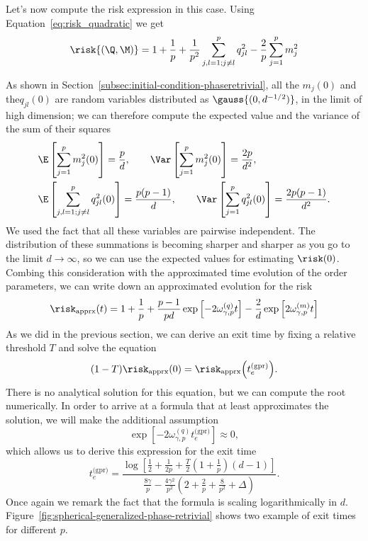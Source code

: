 Let's now compute the risk expression in this case. Using Equation~\eqref{eq:risk_quadratic} we get
\[
  \risk{(\Q,\M)} = 1 + \frac1p + \frac{1}{p^2}\sum_{j,l=1;j\neq l}^p q^2_{jl} - \frac2p \sum_{j=1}^p m^2_{j}
\]

As shown in Section~\ref{subsec:initial-condition-phaseretrivial}, all the \(m_j{(0)}\) and the\(q_{jl}{(0)}\) 
are random variables distributed as \(\gauss{(0,d^{-1/2})}\), in the limit of high dimension;
we can therefore compute the expected value and the variance of the sum of their squares
\[\begin{split}
 &\E\left[\sum_{j=1}^p m_j^2{(0)}\right] = \frac{p}{d}, \qquad
  \Var\left[\sum_{j=1}^p m_j^2{(0)}\right] = \frac{2p}{d^2}, \\
 &\E\left[\sum_{j,l=1;j\neq l}^p q_{jl}^2{(0)}\right] = \frac{p(p-1)}{d}, \qquad
  \Var\left[\sum_{j=1}^p q_{jl}^2{(0)}\right] = \frac{2p(p-1)}{d^2}. \\
\end{split}\]
We used the fact that all these variables are pairwise independent.
The distribution of these summations is becoming sharper and sharper as you go to the limit \(d\to\infty\),
so we can use the expected values for estimating \(\risk(0)\).
Combing this consideration with the approximated time evolution of the order parameters,
we can write down an approximated evolution for the risk
\[
  \risk_\text{apprx}{(t)} = 1 + \frac1p + \frac{p-1}{pd}\exp{\left[-2\omega^{(q)}_{\gamma,p} t\right]} - \frac2d \exp{\left[2\omega^{(m)}_{\gamma,p} t\right]}
\]
As we did in the previous section, we can derive an exit time by fixing a relative threshold \(T\)
and solve the equation 
\begin{equation}\label{eq:exit_time_equation}
  (1-T)\risk_\text{apprx}{(0)} = \risk_\text{apprx}{\left(t^\text{(gpr)}_e\right)}.
\end{equation}
There is no analytical solution for this equation, but we can compute the root numerically.
In order to arrive at a formula that at least approximates the solution, we will make the additional assumption 
\[
  \exp{\left[-2\omega^{(q)}_{\gamma,p} t^\text{(gpr)}_e\right]}  \approx 0,
\]
which allows us to derive this expression for the exit time
\[
  t^\text{(gpr)}_e = \frac{\log\left[\frac12+\frac{1}{2p}+\frac{T}{2}\left(1+\frac{1}{p}\right)(d-1)\right]}{\frac{8 \gamma}{p} -\frac{4 \gamma^2}{p^2} \left(2 +\frac{2}{p} + \frac{8}{p^2} + \Delta \right)}.
\]
Once again we remark the fact that the formula is scaling logarithmically in \(d\).
Figure~\ref{fig:spherical-generalized-phase-retrivial} shows two example of exit times for different \(p\).

